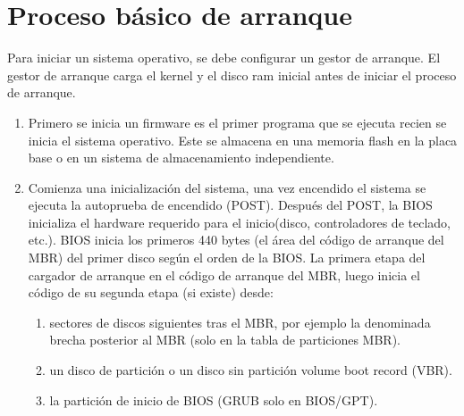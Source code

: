 \documentclass[a4paper]{article} %
\begin{document}
\cfoot{\thepage} %
\clearpage
    \tableofcontents
    \clearpage

\section{Proceso básico de arranque}

Para iniciar un sistema operativo, se debe configurar un gestor de arranque. El gestor de arranque carga el kernel y el disco ram inicial antes de iniciar el proceso de arranque. 

\begin{enumerate}
\item Primero se inicia un firmware es el primer programa que se ejecuta recien se inicia el sistema operativo. Este se almacena en una memoria flash en la placa base o en un sistema de almacenamiento independiente.
\item Comienza una inicialización del sistema, una vez encendido el sistema se ejecuta la autoprueba de encendido (POST). Después del POST, la BIOS inicializa el hardware requerido para el inicio(disco, controladores de teclado, etc.). BIOS inicia los primeros 440 bytes (el área del código de arranque del MBR) del primer disco según el orden de la BIOS. La primera etapa del cargador de arranque en el código de arranque del MBR, luego inicia el código de su segunda etapa (si existe) desde:

\begin{enumerate}
    \item sectores de discos siguientes tras el MBR, por ejemplo la denominada brecha posterior al MBR (solo en la tabla de particiones MBR).
    \item un disco de partición o un disco sin partición volume boot record (VBR).
    \item la partición de inicio de BIOS (GRUB solo en BIOS/GPT).
\end{enumerate}


\end{enumerate}
\end{document}
